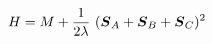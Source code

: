 \begin{equation}
H= M+ \frac{1}{2 \lambda}~ (\mbox{\boldmath$S$}_A +\mbox{\boldmath$S$}_B + \mbox{\boldmath$S$}_C)^2   
\end{equation}

